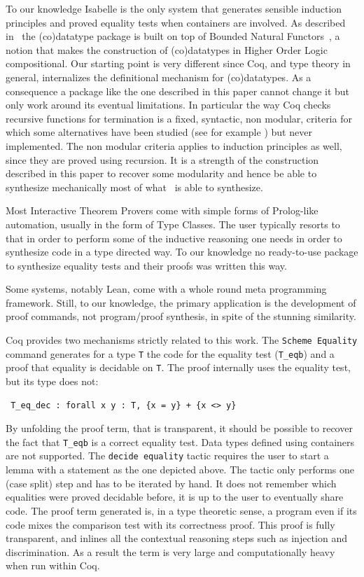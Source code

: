 \documentclass[a4paper,UKenglish,cleveref, autoref]{lipics-v2019}
\begin{document}
To our knowledge Isabelle is the only system that generates sensible induction
principles and proved equality tests when containers are involved. As described
in~\cite{10.1007/978-3-319-08970-6_7} the (co)datatype package is built on top
of Bounded Natural Functors~\cite{Traytel:2012:FCD:2358958.2359545}, a
notion that makes the construction of (co)datatypes in Higher Order Logic
compositional.  Our starting point is very different since Coq, and type theory
in general, internalizes the definitional mechanism for (co)datatypes. As
a consequence a package like the one described in this paper cannot change
it but only work around its eventual limitations.
In particular the way Coq checks recursive functions for termination is
a fixed, syntactic, non modular, criteria for which some alternatives
have been studied (see for example
\cite{DBLP:conf/lpar/BartheGP06, sacchini:pastel-00622429})
but never implemented.
The non modular criteria applies to induction principles
as well, since they are proved using recursion.
It is a strength of the construction
described in this paper to recover some modularity and hence be able to
synthesize mechanically most of what~\cite{10.1007/978-3-319-08970-6_7} is
able to synthesize. 

Most Interactive Theorem Provers come with simple forms of Prolog-like
automation, usually in the form of Type Classes. The user typically
resorts to that in order to perform some of the inductive reasoning
one needs in order to synthesize code in a type directed way.
To our knowledge no ready-to-use package to synthesize equality tests
and their proofs was written this way.

Some systems, notably Lean, come with a whole round meta programming 
framework. Still, to our knowledge, the primary application is the
development of proof commands, not program/proof synthesis, in spite
of the stunning similarity.

Coq provides two mechanisms strictly related to this work.
The \lstinline+Scheme Equality+ command generates for a type
\lstinline+T+ the code for the equality test (\lstinline+T_eqb+) 
and a proof that equality is decidable on \lstinline+T+. The proof
internally uses the equality test, but its type does not:
\begin{lstlisting}
 T_eq_dec : forall x y : T, {x = y} + {x <> y}
\end{lstlisting}

\noindent
By unfolding the proof term, that is transparent, it should be
possible to recover the fact that \lstinline+T_eqb+ is a correct
equality test. Data types defined using containers are not supported.
The \lstinline+decide equality+ tactic requires the user to start
a lemma with a statement as the one depicted above.
The tactic only performs one (case split) step and has to
be iterated by hand. It does not remember which equalities were
proved decidable before, it is up to the user to eventually share code.
The proof term generated is, in a type theoretic sense, a program
even if its code mixes the comparison test with its correctness proof.
This proof is fully transparent, and inlines all the contextual
reasoning steps such as injection and discrimination. As a result the
term is very large and computationally heavy when run within Coq.
\end{document}
